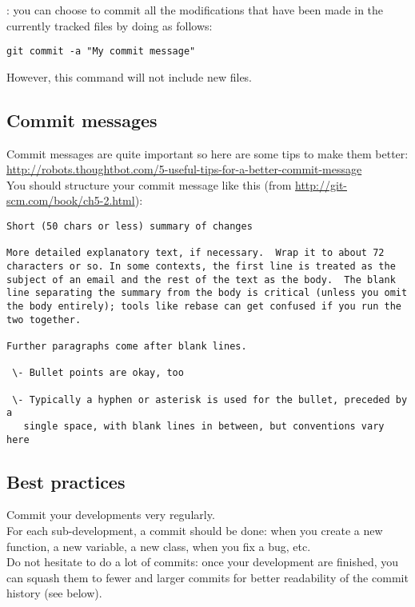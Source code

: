 : you can choose to commit all the modifications that have been
made in the currently tracked files by doing as follows:
\begin{lstlisting}
git commit -a "My commit message"
\end{lstlisting}
However, this command will not include new files.

\subsection{Commit messages}
Commit messages are quite important so here are some tips to make them better:
\url{http://robots.thoughtbot.com/5-useful-tips-for-a-better-commit-message}\\

You should structure your commit message like this (from 
\url{http://git-scm.com/book/ch5-2.html}):
\begin{footnotesize}
\begin{lstlisting}
Short (50 chars or less) summary of changes

More detailed explanatory text, if necessary.  Wrap it to about 72
characters or so. In some contexts, the first line is treated as the
subject of an email and the rest of the text as the body.  The blank
line separating the summary from the body is critical (unless you omit
the body entirely); tools like rebase can get confused if you run the
two together.

Further paragraphs come after blank lines.

 \- Bullet points are okay, too

 \- Typically a hyphen or asterisk is used for the bullet, preceded by a
   single space, with blank lines in between, but conventions vary here
\end{lstlisting}
\end{footnotesize}

\subsection{Best practices}
Commit your developments very regularly.\\

For each sub-development, a commit should be done: when you create a new
function, a new variable, a new class, when you fix a bug, etc.\\

Do not hesitate to do a lot of commits: once your development are finished,
you can squash them to fewer and larger commits for better readability of the
commit history (see below).\\

